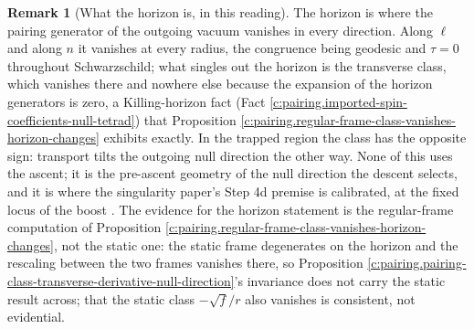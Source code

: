 \documentclass[11pt]{article}
\theoremstyle{definition}
\newtheorem{remark}[theorem]{Remark}
\theoremstyle{plain}
\begin{document}
\begin{remark}[What the horizon is, in this reading]\label{c:note.pairing.what-horizon-reading}
The horizon is where the pairing generator of the outgoing vacuum vanishes in every direction. Along $\ell$ and along $n$ it vanishes at every radius, the congruence being geodesic and $\tau = 0$ throughout Schwarzschild; what singles out the horizon is the transverse class, which vanishes there and nowhere else because the expansion of the horizon generators is zero, a Killing-horizon fact (Fact \ref{c:pairing.imported-spin-coefficients-null-tetrad}) that Proposition \ref{c:pairing.regular-frame-class-vanishes-horizon-changes} exhibits exactly. In the trapped region the class has the opposite sign: transport tilts the outgoing null direction the other way. None of this uses the ascent; it is the pre-ascent geometry of the null direction the descent selects, and it is where the singularity paper's Step 4d premise is calibrated, at the fixed locus of the boost \cite[Prop.~7.25]{ButlerT5}. The evidence for the horizon statement is the regular-frame computation of Proposition \ref{c:pairing.regular-frame-class-vanishes-horizon-changes}, not the static one: the static frame degenerates on the horizon and the rescaling between the two frames vanishes there, so Proposition \ref{c:pairing.pairing-class-transverse-derivative-null-direction}'s invariance does not carry the static result across; that the static class $-\sqrt f/r$ also vanishes is consistent, not evidential.
\end{remark}
\end{document}
